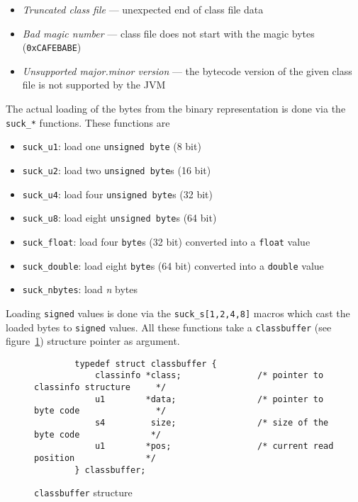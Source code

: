 \begin{itemize}
 \item \textit{Truncated class file} --- unexpected end of class file
 data

 \item \textit{Bad magic number} --- class file does not start with
 the magic bytes (\texttt{0xCAFEBABE})

 \item \textit{Unsupported major.minor version} --- the bytecode
 version of the given class file is not supported by the JVM
\end{itemize}

The actual loading of the bytes from the binary representation is done
via the \texttt{suck\_*} functions. These functions are

\begin{itemize}
 \item \texttt{suck\_u1}: load one \texttt{unsigned byte} (8 bit)

 \item \texttt{suck\_u2}: load two \texttt{unsigned byte}s (16 bit)

 \item \texttt{suck\_u4}: load four \texttt{unsigned byte}s (32 bit)

 \item \texttt{suck\_u8}: load eight \texttt{unsigned byte}s (64 bit)

 \item \texttt{suck\_float}: load four \texttt{byte}s (32 bit)
 converted into a \texttt{float} value

 \item \texttt{suck\_double}: load eight \texttt{byte}s (64 bit)
 converted into a \texttt{double} value

 \item \texttt{suck\_nbytes}: load \textit{n} bytes
\end{itemize}

Loading \texttt{signed} values is done via the
\texttt{suck\_s[1,2,4,8]} macros which cast the loaded bytes to
\texttt{signed} values. All these functions take a
\texttt{classbuffer} (see figure~\ref{classbufferstructure})
structure pointer as argument.

\begin{figure}[h]
\begin{verbatim}
        typedef struct classbuffer {
            classinfo *class;               /* pointer to classinfo structure     */
            u1        *data;                /* pointer to byte code               */
            s4         size;                /* size of the byte code              */
            u1        *pos;                 /* current read position              */
        } classbuffer;
\end{verbatim}
\caption{\texttt{classbuffer} structure}
\label{classbufferstructure}
\end{figure}

